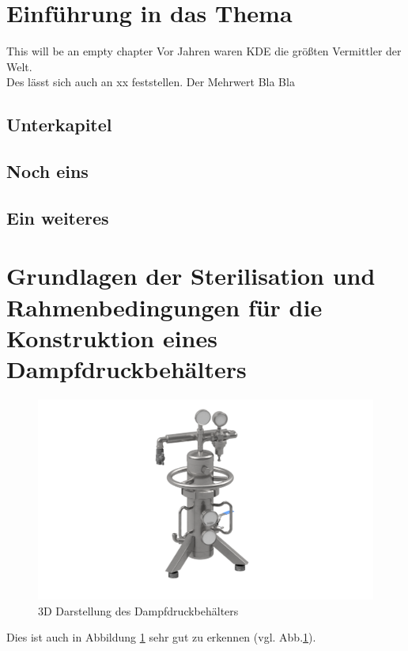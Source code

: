 \documentclass[
    12pt, %
    ngerman, %
    a4paper, %
    oneside, %
    headings=big, %
    listof=totoc, %
    bibliography=totoc, %
    index=totoc, %
    captions=tableheading, %
    final %
]{scrartcl}
\begin{document}
 \cleardoublepage{}



\newpage
{}
\ofoot{\thepage}
\ihead{}
\chead{}
\ohead{\thepage}



\section{Einführung in das Thema}

This will be an empty chapter
Vor Jahren waren \ac{KDE} die größten Vermittler der Welt. \\
Des lässt sich auch an xx feststellen. Der Mehrwert Bla Bla \blindtext\par


\blindtext{}

\subsection{Unterkapitel}
\blindtext{}
\subsection{Noch eins}
\subsection{Ein weiteres}

\newpage
\section{Grundlagen der Sterilisation und Rahmenbedingungen für die Konstruktion eines Dampfdruckbehälters}
\blindtext[1] \par
\blindtext[1.5] \par
\begin{figure}[htb]
    \centering  
    \includegraphics[keepaspectratio,width=\textwidth,height=\textheight]{img/render.png}
    \caption{3D Darstellung des Dampfdruckbehälters}\label{fig:render}
\end{figure}
\par
Dies ist auch in Abbildung \ref{fig:render} sehr gut zu erkennen (vgl. Abb.\ref{fig:render}).

\blindtext[1.2] \par
\end{document}
